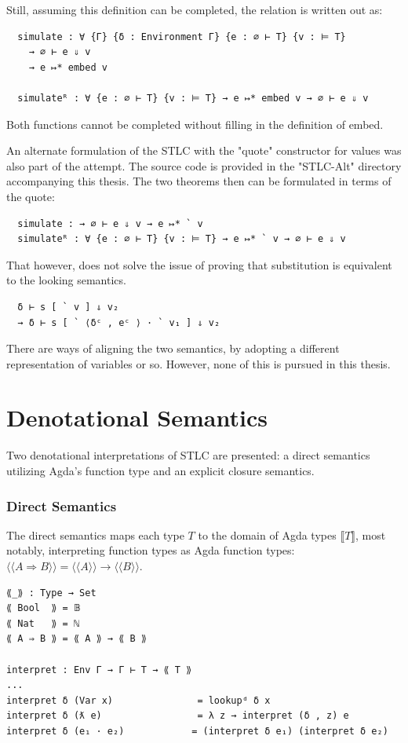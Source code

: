 Still, assuming this definition can be completed, the relation is written out as:
\begin{verbatim}
  simulate : ∀ {Γ} {δ : Environment Γ} {e : ∅ ⊢ T} {v : ⊨ T}
    → ∅ ⊢ e ⇓ v
    → e ↦* embed v

  simulateᴿ : ∀ {e : ∅ ⊢ T} {v : ⊨ T} → e ↦* embed v → ∅ ⊢ e ⇓ v
\end{verbatim}

Both functions cannot be completed without filling in the definition of embed.

An alternate formulation of the STLC with the "quote" constructor for values was also part of the attempt. The source code is provided in the "STLC-Alt" directory accompanying this thesis.
The two theorems then can be formulated in terms of the quote:

\begin{verbatim}
  simulate : → ∅ ⊢ e ⇓ v → e ↦* ` v
  simulateᴿ : ∀ {e : ∅ ⊢ T} {v : ⊨ T} → e ↦* ` v → ∅ ⊢ e ⇓ v
\end{verbatim}

That however, does not solve the issue of proving that substitution is equivalent to the looking semantics.
\begin{verbatim}
  δ ⊢ s [ ` v ] ⇓ v₂
  → δ ⊢ s [ ` ⟨δᶜ , eᶜ ⟩ · ` v₁ ] ⇓ v₂
\end{verbatim}
There are ways of aligning the two semantics, by adopting a different representation of variables or so. However, none of this is pursued in this thesis.

\section{Denotational Semantics}

Two denotational interpretations of STLC are presented: a direct semantics utilizing Agda's function type and an explicit
closure semantics.

\subsubsection*{Direct Semantics}

The direct semantics maps each type $T$ to the domain of Agda types $\llbracket T \rrbracket$,
most notably, interpreting function types as Agda function types:
$\langle \langle A \Rightarrow B \rangle \rangle = \langle \langle A \rangle \rangle \to \langle \langle B \rangle \rangle$.

\begin{verbatim}
⟪_⟫ : Type → Set
⟪ Bool  ⟫ = 𝔹
⟪ Nat   ⟫ = ℕ
⟪ A ⇒ B ⟫ = ⟪ A ⟫ → ⟪ B ⟫

interpret : Env Γ → Γ ⊢ T → ⟪ T ⟫
...
interpret δ (Var x)               = lookupᵈ δ x
interpret δ (ƛ e)                 = λ z → interpret (δ , z) e
interpret δ (e₁ · e₂)            = (interpret δ e₁) (interpret δ e₂)
\end{verbatim}

